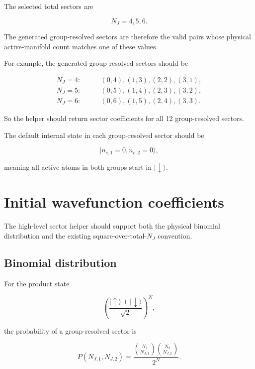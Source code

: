 \documentclass[11pt]{article}
\begin{document}
The selected total sectors are

\begin{equation}
N_J=4,5,6.
\end{equation}

The generated group-resolved sectors are therefore the valid pairs whose
physical active-manifold count matches one of these values.

For example, the generated group-resolved sectors should be

\begin{align}
N_J=4: &\qquad (0,4),(1,3),(2,2),(3,1),\\
N_J=5: &\qquad (0,5),(1,4),(2,3),(3,2),\\
N_J=6: &\qquad (0,6),(1,5),(2,4),(3,3).
\end{align}

So the helper should return sector coefficients for all 12 group-resolved
sectors.

The default internal state in each group-resolved sector should be

\begin{equation}
|n_{e,1}=0,n_{e,2}=0\rangle,
\end{equation}

meaning all active atoms in both groups start in \(|\downarrow\rangle\).

\section*{Initial wavefunction coefficients}

The high-level sector helper should support both the physical binomial
distribution and the existing square-over-total-\(N_J\) convention.

\subsection*{Binomial distribution}

For the product state

\begin{equation}
\left(\frac{|\uparrow\rangle+|\downarrow\rangle}{\sqrt{2}}\right)^N,
\end{equation}

the probability of a group-resolved sector is

\begin{equation}
P(N_{J,1},N_{J,2})
=
\frac{
\binom{N_1}{N_{J,1}}
\binom{N_2}{N_{J,2}}
}{2^N}.
\end{equation}
\end{document}
